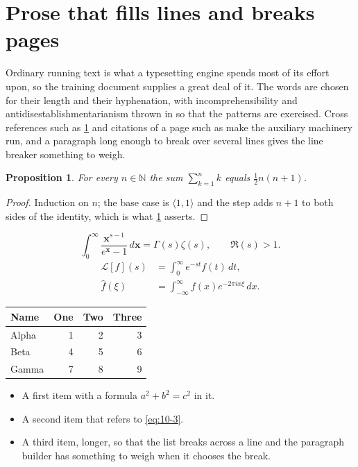 \documentclass[11pt,a4paper]{report}
\theoremstyle{plain}
\newtheorem{proposition}{Proposition}[chapter]
\newcommand{\vecn}[1]{\mathbf{#1}}
\newcommand{\pairs}[2]{\langle #1,#2\rangle}
\begin{document}
\section{Prose that fills lines and breaks pages}
\label{sec:prose10-3}
Ordinary running text is what a typesetting engine spends most of its effort
upon, so the training document supplies a great deal of it. The words are
chosen for their length and their hyphenation, with incomprehensibility and
antidisestablishmentarianism thrown in so that the patterns are exercised.
Cross references such as \cref{sec:prose10-3} and citations of a page such
as \pageref{sec:prose10-3} make the auxiliary machinery run, and a
paragraph long enough to break over several lines gives the line breaker
something to weigh.
\begin{proposition}\label{prop:10-3}
For every $n\in\mathbb{N}$ the sum $\sum_{k=1}^{n}k$ equals
$\tfrac{1}{2}n(n+1)$.
\end{proposition}
\begin{proof}
Induction on $n$; the base case is $\pairs{1}{1}$ and the step adds $n+1$ to
both sides of the identity, which is what \cref{prop:10-3} asserts.
\end{proof}
\begin{equation}\label{eq:10-3}
  \int_{0}^{\infty}\frac{\vecn{x}^{s-1}}{e^{\vecn{x}}-1}\,d\vecn{x}
    = \Gamma(s)\zeta(s),\qquad \Re(s)>1 .
\end{equation}
\begin{align}
  \mathcal{L}[f](s) &= \int_{0}^{\infty} e^{-st} f(t)\,dt, \\
  \widehat{f}(\xi)  &= \int_{-\infty}^{\infty} f(x) e^{-2\pi i x\xi}\,dx .
\end{align}
\par\noindent\begin{center}
\begin{tabular}{lrrr}
\hline
Name & One & Two & Three \\
\hline
Alpha & 1 & 2 & 3 \\
Beta & 4 & 5 & 6 \\
Gamma & 7 & 8 & 9 \\
\hline
\end{tabular}
\end{center}
\begin{itemize}
  \item A first item with a formula $a^2+b^2=c^2$ in it.
  \item A second item that refers to \eqref{eq:10-3}.
  \item A third item, longer, so that the list breaks across a line and the
    paragraph builder has something to weigh when it chooses the break.
\end{itemize}
\end{document}

